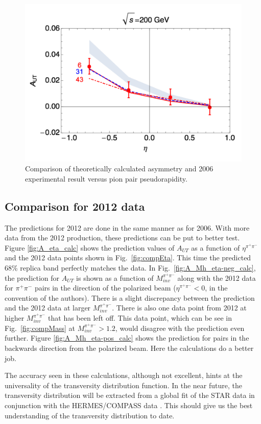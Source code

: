 \documentclass[letterpaper, abstract = on,listof=totoc, bibliography=totoc]{scrreprt}
\newcommand{\mpair}{M_{inv}^{\pi^+\pi^-}}
\newcommand{\etapair}{\eta^{\pi^+\pi^-}}
\newcommand{\pip}{\pi^+}
\newcommand{\pim}{\pi^-}
\newcommand{\pair}{$\pip\pim$ }
\begin{document}
\begin{figure}
\begin{center}
\includegraphics[width = .6\textwidth]{2006PredEta}
\caption[Comparison of theoretically calculated asymmetry and 2006 experimental result versus pion pair pseudorapidity]{Comparison of theoretically calculated asymmetry and 2006 experimental result versus pion pair pseudorapidity.}
\label{fig:2006PredEta}
\end{center}
\end{figure}



\FloatBarrier
\subsection{Comparison for 2012 data}

The predictions for 2012 are done in the same manner as for 2006. With more data from the 2012 production, these predictions can be put to better test. Figure \ref{fig:A_eta_calc} shows the prediction values of $A_{UT}$ as a function of $\etapair$ and the 2012 data points shown in Fig.~\ref{fig:compEta}. This time the predicted 68\% replica band perfectly matches the data. In Fig.~\ref{fig:A_Mh_eta-neg_calc}, the prediction for $A_{UT}$ is shown as a function of $\mpair$ along with the 2012 data for \pair pairs in the direction of the polarized beam ($\etapair < 0$, in the convention of the authors). There is a slight discrepancy between the prediction and the 2012 data at larger $\mpair$. There is also one data point from 2012 at higher $\mpair$ that has been left off. This data point, which can be see in Fig.~\ref{fig:compMass} at $\mpair > 1.2$, would disagree with the prediction even further. Figure \ref{fig:A_Mh_eta-pos_calc} shows the prediction for pairs in the backwards direction from the polarized beam. Here the calculations do a better job.    

The accuracy seen in these calculations, although not excellent, hints at the universality of the transversity distribution function. In the near future, the transversity distribution will be extracted from a global fit of the STAR data in conjunction with the HERMES/COMPASS data \cite{univTrans}. This should give us the best understanding of the transversity distribution to date.  
\end{document}

